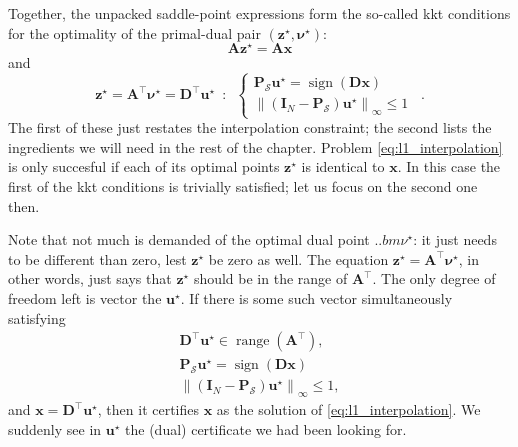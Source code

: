 Together, the unpacked saddle-point expressions form the so-called \acrfull{kkt} conditions for the optimality of the primal-dual pair $(\mathbf{z}^\star, \bm{\nu}^\star)$:
\begin{equation*}
    \mathbf{A}\mathbf{z}^{\star} = \mathbf{Ax}
\end{equation*}
and
\begin{equation*}
    \mathbf{z}^\star = \mathbf{A}^{\top} \bm{\nu}^\star = \mathbf{D}^\top \mathbf{u}^\star \enspace : \enspace \left\{
    \begin{matrix}
        \mathbf{P}_{\mathcal{S}} \mathbf{u}^\star =  \operatorname{sign} \left ( \mathbf{Dx} \right )\\
        \left \| \left ( \mathbf{I}_N - \mathbf{P}_\mathcal{S} \right ) \mathbf{u}^\star \right \|_{\infty} \leq 1
    \end{matrix}
    \right. \enspace .
\end{equation*}
The first of these just restates the interpolation constraint; the second lists the ingredients we will need in the rest of the chapter. Problem \eqref{eq:l1_interpolation} is only succesful if each of its optimal points $\mathbf{z}^\star$ is identical to $\mathbf{x}$. In this case the first of the \acrshort{kkt} conditions is trivially satisfied; let us focus on the second one then.

Note that not much is demanded of the optimal dual point $..bm{\nu}^\star$: it just needs to be different than zero, lest $\mathbf{z}^\star$ be zero as well. The equation $\mathbf{z}^\star = \mathbf{A}^{\top} \bm{\nu}^\star$, in other words, just says that $\mathbf{z}^\star$ should be in the range of $\mathbf{A}^\top$. The only degree of freedom left is vector the $\mathbf{u}^\star$. If there is some such vector simultaneously satisfying
\begin{align}
    \label{eq:kkt0}\mathbf{D}^\top \mathbf{u}^\star \in \operatorname{range} \left( \mathbf{A}^\top \right),\\
    \label{eq:kkt1}\mathbf{P}_{\mathcal{S}} \mathbf{u}^\star =  \operatorname{sign} \left ( \mathbf{Dx} \right )\\
    \label{eq:kkt2}\left \| \left ( \mathbf{I}_N - \mathbf{P}_\mathcal{S} \right ) \mathbf{u}^\star \right \|_{\infty} \leq 1,
\end{align}
and $\mathbf{x} = \mathbf{D}^\top \mathbf{u}^\star$, then it certifies $\mathbf{x}$ as the solution of \eqref{eq:l1_interpolation}. We suddenly see in $\mathbf{u}^\star$ the (dual) certificate we had been looking for.


